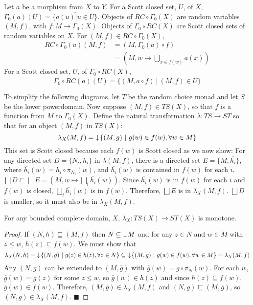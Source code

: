Let $a$ be a morphism from $X$ to $Y$.  For a Scott closed set, $U$, of $X$, $\Gamma_{0}(a)(U) = \overline{\{a(u)|u\in U\}}$.  Objects of $RC\circ \Gamma_{0}(X)$ are random variables $(M,f)$, with $f:M\to \Gamma_{0}(X)$.  Objects of $\Gamma_{0}\circ RC(X)$ are Scott closed sets of random variables on $X$.  For $(M,f) \in RC\circ \Gamma_{0}(X)$, 
\begin{align*}
RC\circ \Gamma_{0}(a)(M,f) &= (M,\Gamma_{0}(a)\circ f) \\
&= (M,w\mapsto \overline{\bigcup_{x\in f(w)}a(x)})
\end{align*}
For a Scott closed set, $U$, of $\Gamma_{0}\circ RC(X)$, \[\Gamma_{0}\circ RC(a)(U) = \overline{\{(M,a\circ f)\ |\ (M,f)\in U\}}\]

To simplify the following diagrams, let $T$ be the random choice monad and let $S$ be the lower powerdomain.  Now suppose $(M,f) \in TS(X)$, so that $f$ is a function from $M$ to $\Gamma_{0}(X)$.  Define the natural transformation $\lambda:TS\to ST$ so that for an object $(M,f)$ in $TS(X)$:
\begin{displaymath}
\lambda_X(M,f) =\, \,\downarrow\! \{(M,g)\ |\ g(w)\in f(w), \forall w\in M\}
\end{displaymath}
This set is Scott closed because each $f(w)$ is Scott closed as we now show:  For any directed set $D = \{N_i,h_i\}$ in $\lambda(M,f)$, there is a directed set $E = \{M,\overline{h_i}\}$, where $\overline{h_i}(w) = h_i\circ \pi_{N_i}(w)$, and $\overline{h_i}(w)$ is contained in $f(w)$ for each $i$.  $\bigsqcup D \sqsubseteq \bigsqcup E = (M,w\mapsto \bigsqcup_i \overline{h_i}(w))$.  Since $\overline{h_i}(w)$ is in $f(w)$ for each $i$ and $f(w)$ is closed, $\bigsqcup_i \overline{h_i}(w)$ is in $f(w)$.  Therefore, $\bigsqcup E$ is in $\lambda_X(M,f)$.  $\bigsqcup D$ is smaller, so it must also be in $\lambda_X(M,f)$.

\begin{proposition}
For any bounded complete domain, $X$, $\lambda_X:TS(X)\to ST(X)$ is monotone.
\end{proposition}
\begin{proof}
If $(N,h) \sqsubseteq (M,f)$ then $N\subseteq\, \,\downarrow\! M$ and for any $z\in N$ and $w\in M$ with $z\leq w$, $h(z) \subseteq f(w)$.  We must show that \[\lambda_X(N,h) =\, \da \{(N,g)\ |\ g(z)\in h(z), \forall z\in N\} \subseteq\, \da \{(M,g)\ |\ g(w)\in f(w), \forall w\in M\} = \lambda_X(M,f)\]  Any $(N,g)$ can be extended to $(M,\overline{g})$ with $\overline{g}(w) = g\circ \pi_N(w)$.  For each $w$, $\overline{g}(w) = g(z)$ for some $z\leq w$, so $\overline{g}(w) \in h(z)$ and since $h(z) \subseteq f(w)$, $\overline{g}(w) \in f(w)$.  Therefore, $(M,\overline{g}) \in \lambda_X(M,f)$ and $(N,g)\sqsubseteq (M,\overline{g})$, so $(N,g) \in \lambda_X(M,f)$.
\hfill $\blacksquare$
\end{proof}

